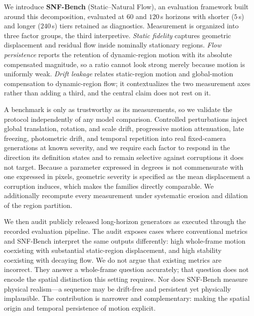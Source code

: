 We introduce \textbf{SNF-Bench} (Static--Natural Flow), an evaluation framework built around this decomposition, evaluated at $60$ and $120$\,s horizons with shorter ($5$\,s) and longer ($240$\,s) tiers retained as diagnostics. Measurement is organized into three factor groups, the third interpretive. \emph{Static fidelity} captures geometric displacement and residual flow inside nominally stationary regions. \emph{Flow persistence} reports the retention of dynamic-region motion with its absolute compensated magnitude, so a ratio cannot look strong merely because motion is uniformly weak. \emph{Drift leakage} relates static-region motion and global-motion compensation to dynamic-region flow; it contextualizes the two measurement axes rather than adding a third, and the central claim does not rest on it.

A benchmark is only as trustworthy as its measurements, so we validate the protocol independently of any model comparison. Controlled perturbations inject global translation, rotation, and scale drift, progressive motion attenuation, late freezing, photometric drift, and temporal repetition into real fixed-camera generations at known severity, and we require each factor to respond in the direction its definition states and to remain selective against corruptions it does not target. Because a parameter expressed in degrees is not commensurate with one expressed in pixels, geometric severity is specified as the mean displacement a corruption induces, which makes the families directly comparable. We additionally recompute every measurement under systematic erosion and dilation of the region partition.

We then audit publicly released long-horizon generators as executed through the recorded evaluation pipeline. The audit exposes cases where conventional metrics and SNF-Bench interpret the same outputs differently: high whole-frame motion coexisting with substantial static-region displacement, and high stability coexisting with decaying flow. We do not argue that existing metrics are incorrect. They answer a whole-frame question accurately; that question does not encode the spatial distinction this setting requires. Nor does SNF-Bench measure physical realism---a sequence may be drift-free and persistent yet physically implausible. The contribution is narrower and complementary: making the spatial origin and temporal persistence of motion explicit.

